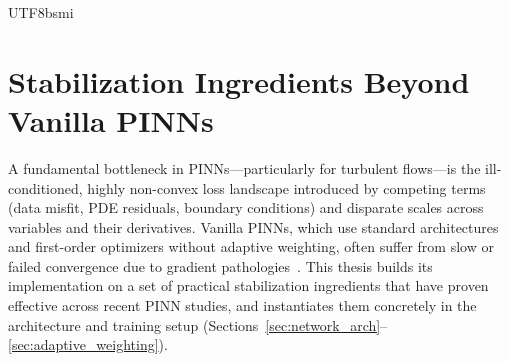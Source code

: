 \documentclass[master]{NTHUthesis}
\begin{document}
\begin{CJK*}{UTF8}{bsmi}
\section{Stabilization Ingredients Beyond Vanilla PINNs}
\label{sec:pinns_stabilization}

A fundamental bottleneck in PINNs---particularly for turbulent flows---is the ill-conditioned, highly non-convex loss landscape introduced by competing terms (data misfit, PDE residuals, boundary conditions) and disparate scales across variables and their derivatives. Vanilla PINNs, which use standard architectures and first-order optimizers without adaptive weighting, often suffer from slow or failed convergence due to gradient pathologies~\cite{Wang2021JCP}. This thesis builds its implementation on a set of practical stabilization ingredients that have proven effective across recent PINN studies, and instantiates them concretely in the architecture and training setup (Sections~\ref{sec:network_arch}--\ref{sec:adaptive_weighting}).


\end{CJK*}
\end{document}
